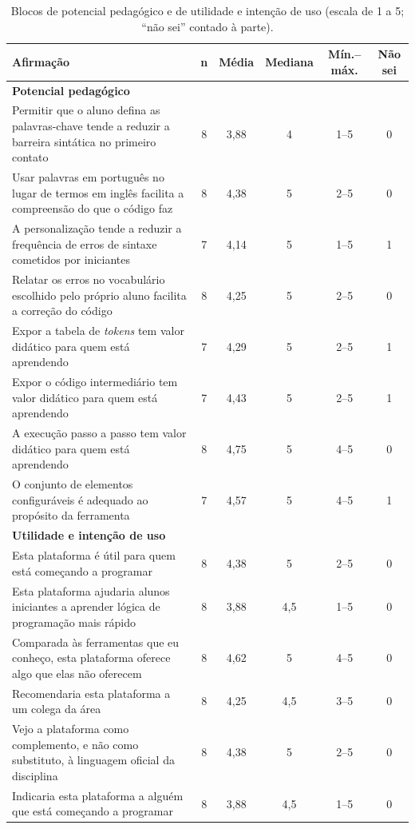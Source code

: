 \begin{table}[htbp]
\centering
\caption{Blocos de potencial pedagógico e de utilidade e intenção de uso (escala de 1 a 5; ``não sei'' contado à parte).}
\label{tab:resultado-pedagogico}
\footnotesize
\renewcommand{\arraystretch}{1.2}
\begin{tabular}{|p{8.0cm}|c|c|c|c|c|}
\hline
\textbf{Afirmação} & \textbf{n} & \textbf{Média} & \textbf{Mediana} & \textbf{Mín.--máx.} & \textbf{Não sei} \\\hline
\multicolumn{6}{|l|}{\textbf{Potencial pedagógico}} \\\hline
Permitir que o aluno defina as palavras-chave tende a reduzir a barreira sintática no primeiro contato & 8 & 3,88 & 4 & 1--5 & 0 \\\hline
Usar palavras em português no lugar de termos em inglês facilita a compreensão do que o código faz & 8 & 4,38 & 5 & 2--5 & 0 \\\hline
A personalização tende a reduzir a frequência de erros de sintaxe cometidos por iniciantes & 7 & 4,14 & 5 & 1--5 & 1 \\\hline
Relatar os erros no vocabulário escolhido pelo próprio aluno facilita a correção do código & 8 & 4,25 & 5 & 2--5 & 0 \\\hline
Expor a tabela de \textit{tokens} tem valor didático para quem está aprendendo & 7 & 4,29 & 5 & 2--5 & 1 \\\hline
Expor o código intermediário tem valor didático para quem está aprendendo & 7 & 4,43 & 5 & 2--5 & 1 \\\hline
A execução passo a passo tem valor didático para quem está aprendendo & 8 & 4,75 & 5 & 4--5 & 0 \\\hline
O conjunto de elementos configuráveis é adequado ao propósito da ferramenta & 7 & 4,57 & 5 & 4--5 & 1 \\\hline
\multicolumn{6}{|l|}{\textbf{Utilidade e intenção de uso}} \\\hline
Esta plataforma é útil para quem está começando a programar & 8 & 4,38 & 5 & 2--5 & 0 \\\hline
Esta plataforma ajudaria alunos iniciantes a aprender lógica de programação mais rápido & 8 & 3,88 & 4,5 & 1--5 & 0 \\\hline
Comparada às ferramentas que eu conheço, esta plataforma oferece algo que elas não oferecem & 8 & 4,62 & 5 & 4--5 & 0 \\\hline
Recomendaria esta plataforma a um colega da área & 8 & 4,25 & 4,5 & 3--5 & 0 \\\hline
Vejo a plataforma como complemento, e não como substituto, à linguagem oficial da disciplina & 8 & 4,38 & 5 & 2--5 & 0 \\\hline
Indicaria esta plataforma a alguém que está começando a programar & 8 & 3,88 & 4,5 & 1--5 & 0 \\\hline
\end{tabular}
\end{table}

